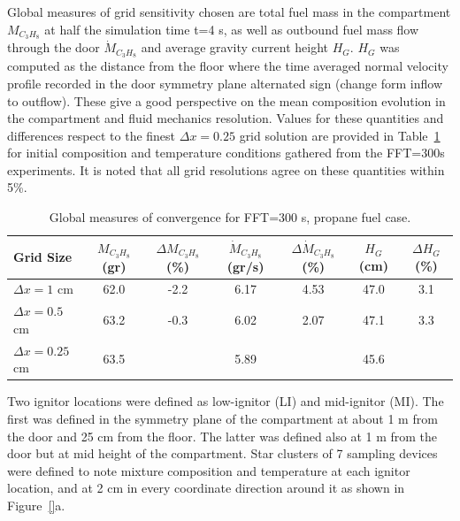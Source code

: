 \documentclass[12pt,letterpaper]{article}
\begin{document}
\begin{flushleft}
Global measures of grid sensitivity chosen are total fuel mass in the compartment $M_{C_3H_8}$ at half the simulation time t=4 s, as well as outbound fuel mass flow through the door $\dot{M}_{C_3H_8}$ and average gravity current height $H_G$. 
$H_G$ was computed as the distance from the floor where the time averaged normal velocity profile recorded in the door symmetry plane alternated sign (change form inflow to outflow). 
These give a good perspective on the mean composition evolution in the compartment and fluid mechanics resolution. Values for these quantities and differences respect to the finest  $\Delta x=0.25$ grid solution are provided in Table~\ref{tab:errgrid} for initial composition and temperature conditions gathered from the FFT=300s experiments. It is noted that all grid resolutions agree on these quantities within 5\%.

\begin{table}[h!]
\caption{Global measures of convergence for FFT=300 s, propane fuel case.}
\label{tab:errgrid}
\centering
\footnotesize
\begin{tabular}{l c c c c c c}
\hline
Grid Size & $M_{C_3H_8}$ (gr)	& $\Delta M_{C_3H_8}$ (\%) & $\dot{M}_{C_3H_8}$ (gr/s) & $\Delta \dot{M}_{C_3H_8}$ (\%) & $H_G$ (cm) & $\Delta H_G$ (\%)\\
\hline
$\Delta x=1$    cm & 62.0 & -2.2 & 6.17 & 4.53  & 47.0 & 3.1 \\
$\Delta x=0.5$  cm & 63.2 & -0.3 & 6.02 & 2.07  & 47.1 & 3.3 \\
$\Delta x=0.25$ cm & 63.5 &      & 5.89 &       & 45.6 &  \\
\hline
\end{tabular}
\end{table}



Two ignitor locations were defined as low-ignitor (LI) and mid-ignitor (MI). The first was defined in the symmetry plane of the compartment at about 1 m from the door and 25 cm from the floor. The latter was defined also at 1 m from the door but at mid height of the compartment. Star clusters of 7 sampling devices were defined to note mixture composition and temperature at each ignitor location, and at 2 cm in every coordinate direction around it as shown in Figure~\ref{}a.


\end{flushleft}
\end{document}
